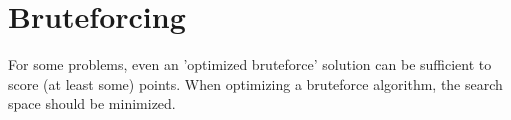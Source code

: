 \section{Bruteforcing}

For some problems, even an 'optimized bruteforce' solution can be sufficient to score (at least some) points.
When optimizing a bruteforce algorithm, the search space should be minimized.




